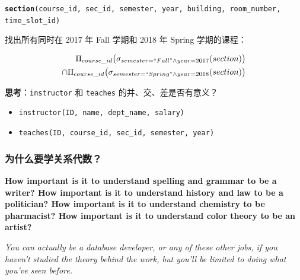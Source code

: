 \documentclass[aspectratio=169, 14pt]{beamer}
\begin{document}
\begin{frame}
	\texttt{\textbf{section}(course\_id, sec\_id, semester, year, building, room\_number, time\_slot\_id)}

	找出所有同时在 2017 年 Fall 学期和 2018 年 Spring 学期的课程：

	\begin{equation*}
		\begin{split}
			\Pi_{course\_id}\bigl(\sigma_{semester=``Fall" \land year=2017}(section)\bigr) \\ \cap
			\Pi_{course\_id}\bigl(\sigma_{semester=``Spring" \land year=2018}(section)\bigr)
		\end{split}
	\end{equation*}

\end{frame}

\begin{frame}

	{\large {}} \textbf{思考}：\texttt{instructor} 和 \texttt{teaches} 的并、交、差是否有意义？

	\begin{itemize}
		\item \texttt{instructor(ID, name, dept\_name, salary)}
		\item \texttt{teaches(ID, course\_id, sec\_id, semester, year)}
	\end{itemize}
	\pause
\end{frame}

\begin{frame}
	\frametitle{为什么要学关系代数？}
	\textbf{How important is it to understand spelling and grammar to be a writer? How important is it to understand history and law to be a politician? How important is it to understand chemistry to be pharmacist? How important is it to understand color theory to be an artist?}

	\emph{You can actually be a database developer, or any of these other jobs, if you haven't studied the theory behind the work, but you'll be limited to doing what you've seen before.}

\end{frame}
\end{document}
